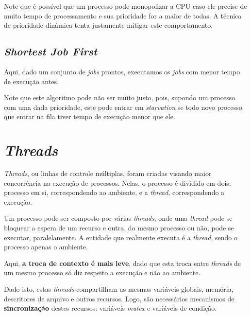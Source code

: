  Note que é possível que um processo pode monopolizar a CPU caso ele precise de muito tempo de processamento e sua prioridade for a maior de todas. A técnica de prioridade dinâmica tenta justamente mitigar este comportamento.






\subsection{\textit{Shortest Job First}}
Aqui, dado um conjunto de \textit{jobs} prontos, executamos os \textit{jobs} com menor tempo de execução antes.

Note que este algoritmo pode não ser muito justo, pois, supondo um processo com uma dada prioridade, este pode entrar em \textit{starvation} se todo novo processo que entrar na fila tiver tempo de execução menor que ele.























\section{\textit{Threads}}
\textit{Threads}, ou linhas de controle múltiplas, foram criadas visando maior concorrência na execução de processos. Nelas, o processo é dividido em dois: processo em si, correspondendo ao ambiente, e a \textit{thread}, correspondendo a execução.

Um processo pode ser composto por várias \textit{threads}, onde uma \textit{thread} pode se bloquear a espera de um recurso e outra, do mesmo processo ou não, pode se executar, paralelamente. A entidade que realmente executa é a \textit{thread}, sendo o processo apenas o ambiente.

Aqui, \textbf{a troca de contexto é mais leve}, dado que esta troca entre \textit{threads} de um mesmo processo só diz respeito a execução e não ao ambiente.

Dado isto, estas \textit{threads} compartilham as mesmas variáveis globais, memória, descritores de arquivo e outros recursos. Logo, são necessários mecanismos de \textbf{sincronização} destes recursos: variáveis \textit{mutex} e variáveis de condição.

